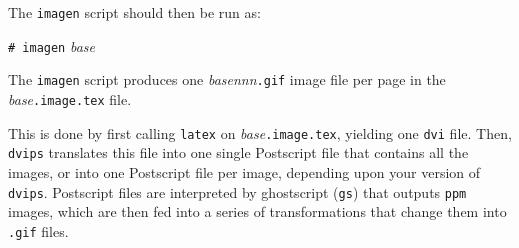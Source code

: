 The \texttt{imagen} script should then be run as:
\begin{flushleft}
\texttt{\# imagen} \textit{base}
\end{flushleft}
The \texttt{imagen} script produces
one \textit{base}\textsl{nnn}\texttt{.gif} image file per page in the
\textit{base}\texttt{.image.tex} file.

This is done by first calling \texttt{latex} on
\textit{base}\texttt{.image.tex}, yielding one \texttt{dvi}
file.
Then, \texttt{dvips} translates this file into one single Postscript file that
contains all 
the images, or into one  Postscript file per image,
depending upon your version of \texttt{dvips}.
Postscript files are interpreted by ghostscript (\texttt{gs}) that
outputs \texttt{ppm} images, which are then fed into a series of
transformations that change them into \texttt{.gif} files.

